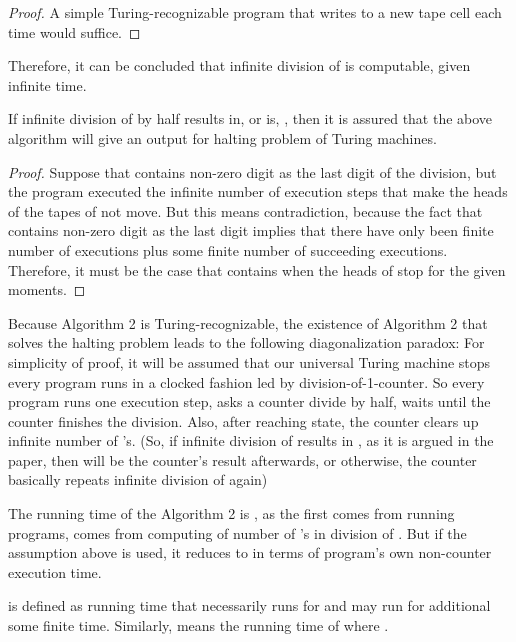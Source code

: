 \documentclass{roffin}
\begin{document}
\begin{proof}
A simple Turing-recognizable program that writes  to a new tape cell each time would suffice. 
\end{proof}
Therefore, it can be concluded that infinite division of  is computable, given infinite time. 
\begin{proposition}
If infinite division of  by half results in, or is, , then it is assured that the above algorithm will give an output for halting problem of Turing machines. 
\end{proposition}
\begin{proof}
Suppose that  contains non-zero digit as the last digit of the division, but the program executed the infinite number of execution steps that make the heads of the tapes of  not move. But this means contradiction, because the fact that  contains non-zero digit as the last digit implies that there have only been finite number of executions plus some finite number of succeeding executions. Therefore, it must be the case that  contains  when the heads of  stop for the given moments.
\end{proof}
Because Algorithm 2 is Turing-recognizable, the existence of Algorithm 2 that solves the halting problem leads to the following diagonalization paradox:
For simplicity of proof, it will be assumed that our universal Turing machine stops every program runs in a clocked fashion led by division-of-1-counter. So every program runs one execution step, asks a counter divide by half, waits until the counter finishes the division. Also, after reaching  state, the counter clears up infinite number of 's. (So, if infinite division of  results in , as it is argued in the paper, then  will be the counter's result afterwards, or otherwise, the counter basically repeats infinite division of  again)
\begin{lemma}
The running time of the Algorithm 2 is , as the first  comes from running programs,  comes from computing of  number of 's in division of . But if the assumption above is used, it reduces to  in terms of program's own non-counter execution time.
\end{lemma}
\begin{definition}
 is defined as running time that necessarily runs for  and may run for additional some finite time. Similarly,  means the running time of  where . 
\end{definition}
\end{document}
